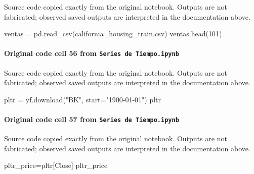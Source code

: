 \documentclass[
  11pt,
]{article}
\newenvironment{Shaded}{}{}
\newcommand{\DecValTok}[1]{\textcolor[rgb]{0.25,0.63,0.44}{#1}}
\newcommand{\NormalTok}[1]{#1}
\newcommand{\OperatorTok}[1]{\textcolor[rgb]{0.40,0.40,0.40}{#1}}
\newcommand{\StringTok}[1]{\textcolor[rgb]{0.25,0.44,0.63}{#1}}
\begin{document}
Source code copied exactly from the original notebook. Outputs are not fabricated; observed saved outputs are interpreted in the documentation above.

\begin{Shaded}
\begin{Highlighting}[]
\NormalTok{ventas }\OperatorTok{=}\NormalTok{ pd.read\_csv(}\StringTok{\textquotesingle{}california\_housing\_train.csv\textquotesingle{}}\NormalTok{)}
\NormalTok{ventas.head(}\DecValTok{101}\NormalTok{)}
\end{Highlighting}
\end{Shaded}

\paragraph{\texorpdfstring{Original code cell 56 from \texttt{Series\ de\ Tiempo.ipynb}}{Original code cell 56 from Series de Tiempo.ipynb}}\label{original-code-cell-56-from-series-de-tiempoipynb}

Source code copied exactly from the original notebook. Outputs are not fabricated; observed saved outputs are interpreted in the documentation above.

\begin{Shaded}
\begin{Highlighting}[]
\NormalTok{pltr }\OperatorTok{=}\NormalTok{ yf.download(}\StringTok{"BK"}\NormalTok{, start}\OperatorTok{=}\StringTok{"1900{-}01{-}01"}\NormalTok{)}
\NormalTok{pltr}
\end{Highlighting}
\end{Shaded}

\paragraph{\texorpdfstring{Original code cell 57 from \texttt{Series\ de\ Tiempo.ipynb}}{Original code cell 57 from Series de Tiempo.ipynb}}\label{original-code-cell-57-from-series-de-tiempoipynb}

Source code copied exactly from the original notebook. Outputs are not fabricated; observed saved outputs are interpreted in the documentation above.

\begin{Shaded}
\begin{Highlighting}[]
\NormalTok{pltr\_price}\OperatorTok{=}\NormalTok{pltr[}\StringTok{\textquotesingle{}Close\textquotesingle{}}\NormalTok{]}
\NormalTok{pltr\_price}
\end{Highlighting}
\end{Shaded}
\end{document}
